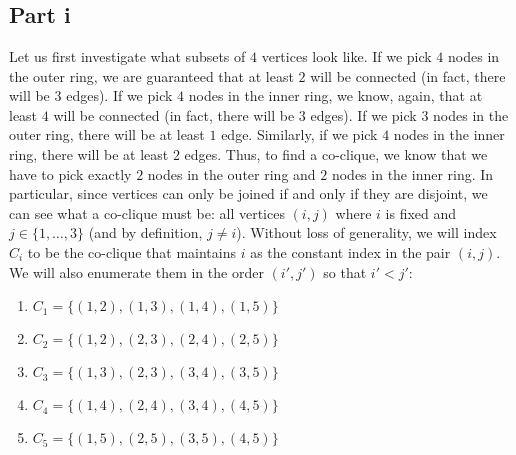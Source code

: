 \documentclass[letterpaper]{article}
\begin{document}
\section{}
\label{sec:Question2}

\subsection{Part i}
\label{subs:2Parti}

Let us first investigate what subsets of $ 4 $ vertices look like.
If we pick $ 4 $ nodes in the outer ring, we are guaranteed that at least $ 2 $ will be connected (in fact, there will be $ 3 $ edges).
If we pick $ 4 $ nodes in the inner ring, we know, again, that at least $ 4 $ will be connected (in fact, there will be $ 3 $ edges).
If we pick $ 3 $ nodes in the outer ring, there will be at least $ 1 $ edge.
Similarly, if we pick $ 4 $ nodes in the inner ring, there will be at least $ 2 $ edges.
Thus, to find a co-clique, we know that we have to pick exactly $ 2 $ nodes in the outer ring and $ 2 $ nodes in the inner ring.
In particular, since vertices can only be joined if and only if they are disjoint, we can see what a co-clique must be: all vertices $ (i,j) $ where $ i $ is fixed and $ j \in \{1, \ldots, 3\} $ (and by definition, $ j \neq i $).
Without loss of generality, we will index $ C_i $ to be the co-clique that maintains $ i $ as the constant index in the pair $ (i, j) $.
We will also enumerate them in the order $ (i', j') $ so that $ i' < j' $:
\begin{enumerate}
    \item $ C_1 = \{(1,2), (1,3), (1,4), (1,5)\} $
    \item $ C_2 = \{(1,2), (2,3), (2,4), (2,5)\} $
    \item $ C_3 = \{(1,3), (2,3), (3,4), (3,5)\} $
    \item $ C_4 = \{(1,4), (2,4), (3,4), (4,5)\} $
    \item $ C_5 = \{(1,5), (2,5), (3,5), (4,5)\} $
\end{enumerate}
\end{document}

